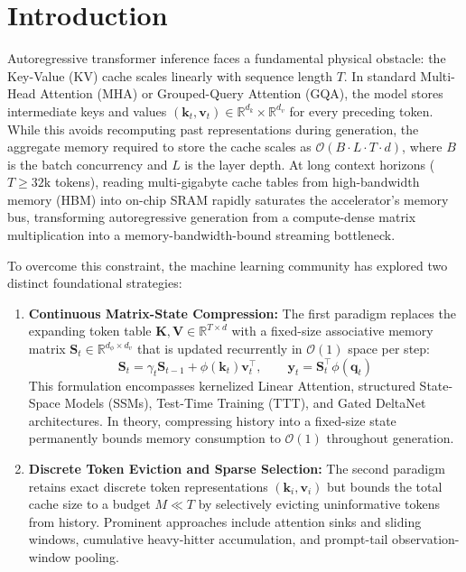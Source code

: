 \documentclass[11pt,a4paper]{article}
\begin{document}
\section{Introduction}
\label{sec:intro}

Autoregressive transformer inference faces a fundamental physical obstacle: the Key-Value (KV) cache scales linearly with sequence length $T$. In standard Multi-Head Attention (MHA) or Grouped-Query Attention (GQA), the model stores intermediate keys and values $(\mathbf{k}_t, \mathbf{v}_t) \in \mathbb{R}^{d_k} \times \mathbb{R}^{d_v}$ for every preceding token. While this avoids recomputing past representations during generation, the aggregate memory required to store the cache scales as $\mathcal{O}(B \cdot L \cdot T \cdot d)$, where $B$ is the batch concurrency and $L$ is the layer depth. At long context horizons ($T \ge 32\text{k}$ tokens), reading multi-gigabyte cache tables from high-bandwidth memory (HBM) into on-chip SRAM rapidly saturates the accelerator's memory bus, transforming autoregressive generation from a compute-dense matrix multiplication into a memory-bandwidth-bound streaming bottleneck.

To overcome this constraint, the machine learning community has explored two distinct foundational strategies:

\begin{enumerate}[leftmargin=*]
    \item \textbf{Continuous Matrix-State Compression:} The first paradigm replaces the expanding token table $\mathbf{K}, \mathbf{V} \in \mathbb{R}^{T \times d}$ with a fixed-size associative memory matrix $\mathbf{S}_t \in \mathbb{R}^{d_\phi \times d_v}$ that is updated recurrently in $\mathcal{O}(1)$ space per step:
    \begin{equation}
    \mathbf{S}_t = \gamma_t \mathbf{S}_{t-1} + \phi(\mathbf{k}_t)\mathbf{v}_t^\top, \qquad \mathbf{y}_t = \mathbf{S}_t^\top \phi(\mathbf{q}_t)
    \end{equation}
    This formulation encompasses kernelized Linear Attention, structured State-Space Models (SSMs), Test-Time Training (TTT), and Gated DeltaNet architectures. In theory, compressing history into a fixed-size state permanently bounds memory consumption to $\mathcal{O}(1)$ throughout generation.
    \item \textbf{Discrete Token Eviction and Sparse Selection:} The second paradigm retains exact discrete token representations $(\mathbf{k}_i, \mathbf{v}_i)$ but bounds the total cache size to a budget $M \ll T$ by selectively evicting uninformative tokens from history. Prominent approaches include attention sinks and sliding windows, cumulative heavy-hitter accumulation, and prompt-tail observation-window pooling.
\end{enumerate}
\end{document}
